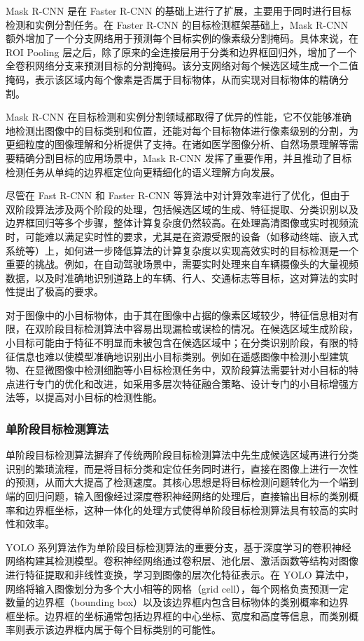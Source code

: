 Mask R-CNN 是在 Faster R-CNN 的基础上进行了扩展，主要用于同时进行目标检测和实例分割任务。在 Faster R-CNN 的目标检测框架基础上，Mask R-CNN 额外增加了一个分支网络用于预测每个目标实例的像素级分割掩码。具体来说，在 ROI Pooling 层之后，除了原来的全连接层用于分类和边界框回归外，增加了一个全卷积网络分支来预测目标的分割掩码。该分支网络对每个候选区域生成一个二值掩码，表示该区域内每个像素是否属于目标物体，从而实现对目标物体的精确分割。

Mask R-CNN 在目标检测和实例分割领域都取得了优异的性能，它不仅能够准确地检测出图像中的目标类别和位置，还能对每个目标物体进行像素级别的分割，为更细粒度的图像理解和分析提供了支持。在诸如医学图像分析、自然场景理解等需要精确分割目标的应用场景中，Mask R-CNN 发挥了重要作用，并且推动了目标检测任务从单纯的边界框定位向更精细化的语义理解方向发展。

尽管在 Fast R-CNN 和 Faster R-CNN 等算法中对计算效率进行了优化，但由于双阶段算法涉及两个阶段的处理，包括候选区域的生成、特征提取、分类识别以及边界框回归等多个步骤，整体计算复杂度仍然较高。在处理高清图像或实时视频流时，可能难以满足实时性的要求，尤其是在资源受限的设备（如移动终端、嵌入式系统等）上，如何进一步降低算法的计算复杂度以实现高效实时的目标检测是一个重要的挑战。例如，在自动驾驶场景中，需要实时处理来自车辆摄像头的大量视频数据，以及时准确地识别道路上的车辆、行人、交通标志等目标，这对算法的实时性提出了极高的要求。

对于图像中的小目标物体，由于其在图像中占据的像素区域较少，特征信息相对有限，在双阶段目标检测算法中容易出现漏检或误检的情况。在候选区域生成阶段，小目标可能由于特征不明显而未被包含在候选区域中；在分类识别阶段，有限的特征信息也难以使模型准确地识别出小目标类别。例如在遥感图像中检测小型建筑物、在显微图像中检测细胞等小目标检测任务中，双阶段算法需要针对小目标的特点进行专门的优化和改进，如采用多层次特征融合策略、设计专门的小目标增强方法等，以提高对小目标的检测性能。

\subsubsection{单阶段目标检测算法}

单阶段目标检测算法摒弃了传统两阶段目标检测算法中先生成候选区域再进行分类识别的繁琐流程，而是将目标分类和定位任务同时进行，直接在图像上进行一次性的预测，从而大大提高了检测速度。其核心思想是将目标检测问题转化为一个端到端的回归问题，输入图像经过深度卷积神经网络的处理后，直接输出目标的类别概率和边界框坐标，这种一体化的处理方式使得单阶段目标检测算法具有较高的实时性和效率。

YOLO 系列算法作为单阶段目标检测算法的重要分支，基于深度学习的卷积神经网络构建其检测模型。卷积神经网络通过卷积层、池化层、激活函数等结构对图像进行特征提取和非线性变换，学习到图像的层次化特征表示。在 YOLO 算法中，网络将输入图像划分为多个大小相等的网格（grid cell），每个网格负责预测一定数量的边界框（bounding box）以及该边界框内包含目标物体的类别概率和边界框坐标。边界框的坐标通常包括边界框的中心坐标、宽度和高度等信息，而类别概率则表示该边界框内属于每个目标类别的可能性。

